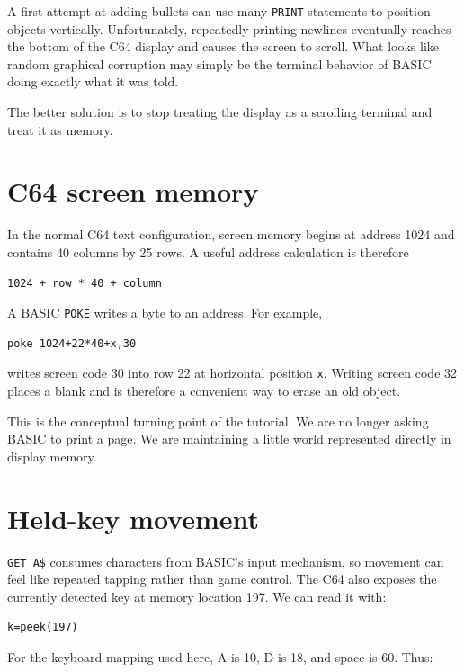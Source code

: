 \documentclass[11pt]{article}
\begin{document}
A first attempt at adding bullets can use many \texttt{PRINT} statements to position objects vertically. Unfortunately, repeatedly printing newlines eventually reaches the bottom of the C64 display and causes the screen to scroll. What looks like random graphical corruption may simply be the terminal behavior of BASIC doing exactly what it was told.

The better solution is to stop treating the display as a scrolling terminal and treat it as memory.

\section{C64 screen memory}

In the normal C64 text configuration, screen memory begins at address 1024 and contains 40 columns by 25 rows. A useful address calculation is therefore

\begin{verbatim}
1024 + row * 40 + column
\end{verbatim}

A BASIC \texttt{POKE} writes a byte to an address. For example,

\begin{lstlisting}[style=basic]
poke 1024+22*40+x,30
\end{lstlisting}

writes screen code 30 into row 22 at horizontal position \texttt{x}. Writing screen code 32 places a blank and is therefore a convenient way to erase an old object.

This is the conceptual turning point of the tutorial. We are no longer asking BASIC to print a page. We are maintaining a little world represented directly in display memory.

\section{Held-key movement}

\texttt{GET A\$} consumes characters from BASIC's input mechanism, so movement can feel like repeated tapping rather than game control. The C64 also exposes the currently detected key at memory location 197. We can read it with:

\begin{lstlisting}[style=basic]
k=peek(197)
\end{lstlisting}

For the keyboard mapping used here, A is 10, D is 18, and space is 60. Thus:
\end{document}
